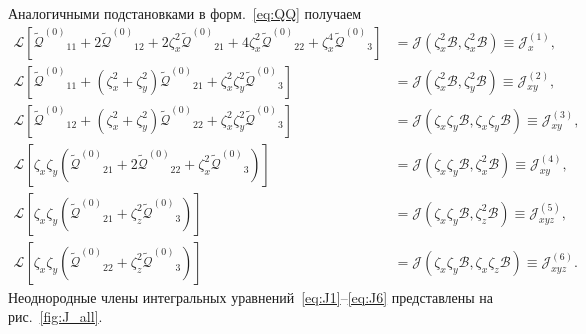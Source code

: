 \documentclass[a4paper,12pt]{article}
\newcommand{\QQ}{\ensuremath{\tilde{\mathcal{Q}}^{(0)}}}
\begin{document}
Аналогичными подстановками в форм.~\eqref{eq:QQ} получаем
\begin{align}
    \mathcal{L}\left[ \QQ_{11} + 2\QQ_{12} + 2\zeta_x^2\QQ_{21} + 4\zeta_x^2\QQ_{22} + \zeta_x^4\QQ_3 \right]
        &= \mathcal{J}\left( \zeta_x^2\mathcal{B}, \zeta_x^2\mathcal{B} \right) \equiv \mathcal{J}_{x}^{(1)}, \label{eq:J1}\\
    \mathcal{L}\left[ \QQ_{11} + (\zeta_x^2+\zeta_y^2)\QQ_{21} + \zeta_x^2\zeta_y^2\QQ_3 \right]
        &= \mathcal{J}\left( \zeta_x^2\mathcal{B}, \zeta_y^2\mathcal{B} \right) \equiv \mathcal{J}_{xy}^{(2)}, \label{eq:J2}\\
    \mathcal{L}\left[ \QQ_{12} + (\zeta_x^2+\zeta_y^2)\QQ_{22} + \zeta_x^2\zeta_y^2\QQ_3 \right]
        &= \mathcal{J}\left( \zeta_x\zeta_y\mathcal{B}, \zeta_x\zeta_y\mathcal{B} \right) \equiv \mathcal{J}_{xy}^{(3)}, \label{eq:J3}\\
    \mathcal{L}\left[ \zeta_x\zeta_y \left( \QQ_{21} + 2\QQ_{22} + \zeta_x^2\QQ_3 \right) \right]
        &= \mathcal{J}\left( \zeta_x\zeta_y\mathcal{B}, \zeta_x^2\mathcal{B} \right) \equiv \mathcal{J}_{xy}^{(4)}, \label{eq:J4}\\
    \mathcal{L}\left[ \zeta_x\zeta_y \left( \QQ_{21} + \zeta_z^2\QQ_3 \right) \right]
        &= \mathcal{J}\left( \zeta_x\zeta_y\mathcal{B}, \zeta_z^2\mathcal{B} \right) \equiv \mathcal{J}_{xyz}^{(5)}, \label{eq:J5}\\
    \mathcal{L}\left[ \zeta_x\zeta_y \left( \QQ_{22} + \zeta_z^2\QQ_3 \right) \right]
        &= \mathcal{J}\left( \zeta_x\zeta_y\mathcal{B}, \zeta_x\zeta_z\mathcal{B} \right) \equiv \mathcal{J}_{xyz}^{(6)}. \label{eq:J6}
\end{align}
Неоднородные члены интегральных уравнений~\eqref{eq:J1}--\eqref{eq:J6} представлены на рис.~\ref{fig:J_all}.
\end{document}
